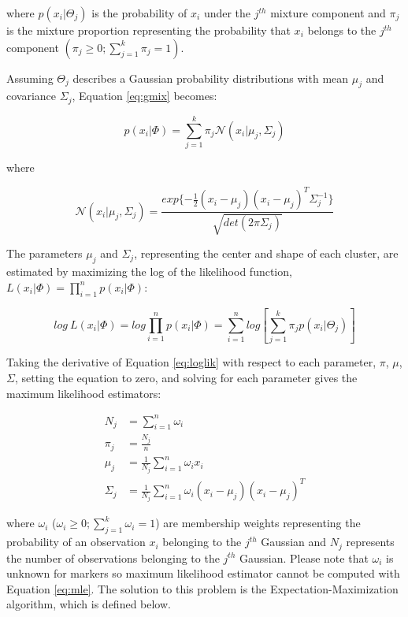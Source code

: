 where \(p(x_i | \Theta_j)\) is the probability of \(x_i\) under the \(j^{th}\) mixture component and \(\pi_j\) is the mixture proportion representing the probability that \(x_i\) belongs to the \(j^{th}\) component \((\pi_j \geq 0; \sum_{j=1}^k \pi_j = 1)\).

Assuming \(\Theta_j\) describes a Gaussian probability distributions with mean \(\mu_j\) and covariance \(\Sigma_j\), Equation \eqref{eq:gmix} becomes:

\begin{equation}
  p(x_i | \Phi) = \sum_{j=1}^k \pi_j \mathcal{N}(x_i | \mu_j, \Sigma_j)
  \label{eq:mix}
\end{equation}

where

\begin{equation}
  \mathcal{N}(x_i | \mu_j, \Sigma_j) = \frac{exp\{ -\frac{1}{2}(x_i - \mu_j)(x_i - \mu_j)^T \Sigma_j^{-1}\}}{\sqrt{det(2 \pi \Sigma_j)}}
  \label{eq:gauss}
\end{equation}

The parameters \(\mu_j\) and \(\Sigma_j\), representing the center and shape of each cluster, are estimated by maximizing the log of the likelihood function, \(L(x_i | \Phi) = \prod_{i=1}^n p(x_i | \Phi)\):

\begin{equation}
  log~L(x_i | \Phi) = log \prod_{i=1}^n p(x_i | \Phi) = \sum_{i=1}^n log \left[ \sum_{j=1}^k \pi_j p(x_i | \Theta_j) \right]
  \label{eq:loglik}
\end{equation}

Taking the derivative of Equation \eqref{eq:loglik} with respect to each parameter, \(\pi\), \(\mu\), \(\Sigma\), setting the equation to zero, and solving for each parameter gives the maximum likelihood estimators:

\begin{equation}
  \begin{aligned}
    N_j &= \sum_{i=1}^n \omega_{i} \\
    \pi_j &= \frac{N_j}{n} \\
    \mu_j &= \frac{1}{N_j} \sum_{i=1}^n \omega_{i} x_i \\
    \Sigma_j &= \frac{1}{N_j} \sum_{i=1}^n \omega_{i} (x_i - \mu_j)(x_i - \mu_j)^T
  \end{aligned}
  \label{eq:mle}
\end{equation}

where \(\omega_{i}\) (\(\omega_{i} \geq 0; \sum_{j=1}^k \omega_{i} = 1\)) are membership weights representing the probability of an observation \(x_i\) belonging to the \(j^{th}\) Gaussian and \(N_j\) represents the number of observations belonging to the \(j^{th}\) Gaussian. Please note that \(\omega_{i}\) is unknown for markers so maximum likelihood estimator cannot be computed with Equation \eqref{eq:mle}. The solution to this problem is the Expectation-Maximization algorithm, which is defined below.

